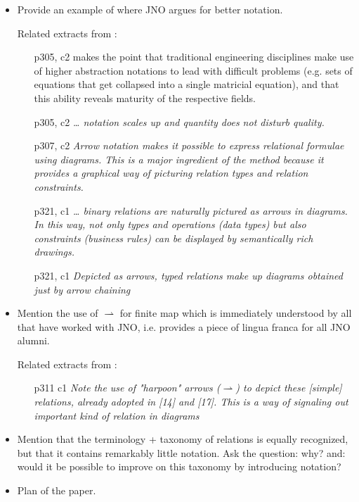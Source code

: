 \documentclass[runningheads,a4paper]{llncs}
\begin{document}
\begin{itemize}
\item Provide an example of where JNO argues for better notation.

Related extracts from \cite{DBLP:journals/tse/OliveiraF13}:
\begin{itemize}
  \item[p305, c2] makes the point that traditional engineering disciplines make use of higher abstraction notations to lead with difficult problems (e.g. sets of equations that get collapsed into a single matricial equation), and that this ability reveals maturity of the respective fields.
  \item[p305, c2] \it{… notation scales up and quantity does not disturb quality.}
  \item[p307, c2] \it{Arrow notation makes it possible to express relational formulae using diagrams. This is a major ingredient of the method because it provides a graphical way of picturing relation types and relation constraints.}
  \item[p321, c1] \it{… binary relations are naturally pictured as arrows in diagrams. In this way, not only types and operations (data types) but also constraints (business rules) can be displayed by semantically rich drawings.}
  \item[p321, c1] \it{Depicted as arrows, typed relations make up diagrams obtained just by arrow chaining}
\end{itemize}

\item Mention the use of $\rightharpoonup$ for finite map which is immediately understood by all that have worked with JNO, i.e. provides a piece of lingua franca for all JNO alumni.

Related extracts from \cite{DBLP:journals/tse/OliveiraF13}:
\begin{itemize}
  \item[p311 c1] \it{Note the use of "harpoon" arrows ($\rightharpoonup$) to depict these [simple] relations, already adopted in [14] and [17]. This is a way of signaling out important kind of relation in diagrams}
\end{itemize}

\item Mention that the terminology + taxonomy of relations is equally recognized, but that it contains remarkably little notation. Ask the question: why? and: would it be possible to improve on this taxonomy by introducing notation?
\item Plan of the paper.
\end{itemize}
\end{document}
